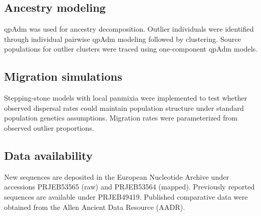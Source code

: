\documentclass[11pt]{article}
\begin{document}
\subsection{Ancestry modeling}
qpAdm was used for ancestry decomposition. Outlier individuals were identified through individual pairwise qpAdm modeling followed by clustering. Source populations for outlier clusters were traced using one-component qpAdm models.

\subsection{Migration simulations}
Stepping-stone models with local panmixia were implemented to test whether observed dispersal rates could maintain population structure under standard population genetics assumptions. Migration rates were parameterized from observed outlier proportions.

\subsection{Data availability}
New sequences are deposited in the European Nucleotide Archive under accessions PRJEB53565 (raw) and PRJEB53564 (mapped). Previously reported sequences are available under PRJEB49419. Published comparative data were obtained from the Allen Ancient Data Resource (AADR).


\end{document}
